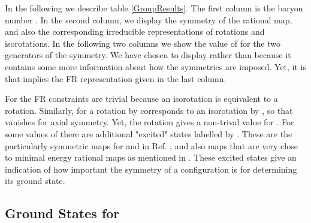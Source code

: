 \documentclass[a4paper,12pt]{article}
\begin{document}
In the following we describe table \ref{GroupResults}.
The first column is the baryon number \coordHE{}. In the second column, we 
display the symmetry of the rational map, and also the corresponding 
irreducible representations of rotations and isorotations. In the 
following two columns we show the value of \coordHE{} for the two generators of the 
symmetry. We have chosen to display \coordHE{} rather than \coordHE{} because it 
contains some more information about how the symmetries are imposed. Yet, 
it is \coordHE{} that implies the FR representation given in the last 
column.

For \coordHE{} the FR constraints are trivial because an isorotation is 
equivalent to a rotation. Similarly, for \coordHE{} a rotation by \myHighlight{$\alpha$}\coordHE{} 
corresponds to an isorotation by \myHighlight{$2 \alpha$}\coordHE{}, so that \coordHE{} vanishes for 
axial symmetry. Yet, the \coordHE{} rotation gives a non-trival value for \coordHE{}.
For some values of \coordHE{} there are additional "excited" states labelled 
by \coordHE{}. 
These are the particularly symmetric maps for \coordHE{} and \coordHE{} in 
Ref. \cite{Houghton:1998kg}, and also maps that are very close to minimal 
energy rational maps as mentioned in \cite{Battye:2001qn}. These excited 
states \coordHE{} give an indication of how important the symmetry of a 
configuration is for determining its ground state.

\subsection{Ground States for \coordHE{}}
\label{Groundstates}
\end{document}
